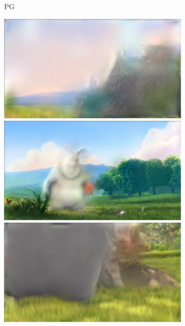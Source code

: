 \begin{figure}
\begin{subfigure}[t]{0.135\textwidth}
		\caption{PG}
	\end{subfigure}
	\begin{subfigure}[t]{0.135\textwidth}
		\includegraphics[width=\textwidth]{figures/stereo/bbb_frame-0004-4}\\
		\includegraphics[width=\textwidth]{figures/stereo/bbb_frame-0092-4}\\
		\includegraphics[width=\textwidth]{figures/stereo/bbb_frame-0124-4}\\

\end{subfigure}
\end{figure}
